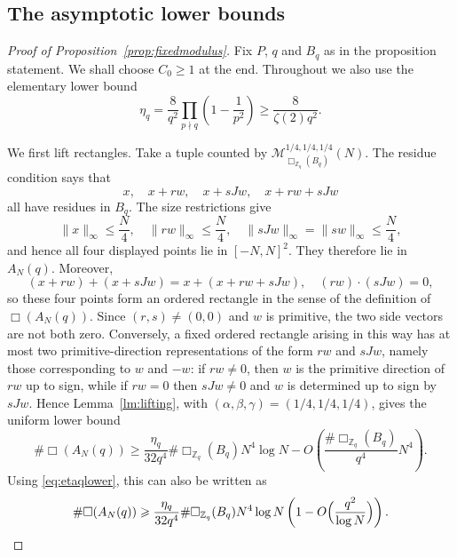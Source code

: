 \documentclass[10pt,a4paper]{amsart}
\numberwithin{equation}{section}
\newcommand{\norm}[1]{\lVert #1\rVert_\infty}
\renewcommand{\le}{\leqslant}
\renewcommand{\ge}{\geqslant}
\begin{document}
\subsection{The asymptotic lower bounds}
\begin{proof}[Proof of Proposition~\ref{prop:fixedmodulus}]
Fix $P$, $q$ and $B_q$ as in the proposition statement. 
We shall choose $C_0\ge1$ at the end. Throughout we also use the elementary lower bound
\begin{equation}\label{eq:etaqlower}
\eta_q=\frac8{q^2}\prod_{p\nmid q}\left(1-\frac1{p^2}\right) \ge \frac{8}{\zeta(2)q^2}.
\end{equation}

We first lift rectangles. Take a tuple counted by
$\mathcal{M}_{\Box_{\mathbb{Z}_q}(B_q)}^{1/4,1/4,1/4}(N)$. The residue condition says that
\[ x, \quad x+rw, \quad x+sJw, \quad x+rw+sJw \]
all have residues in $B_q$. The size restrictions give
\[ \norm{x}\le \frac{N}{4}, \quad \norm{rw}\le \frac{N}{4}, \quad \norm{sJw}=\norm{sw}\le \frac{N}{4}, \]
and hence all four displayed points lie in $[-N,N]^2$. They therefore lie in $A_N(q)$. Moreover,
\[ (x+rw)+(x+sJw)=x+(x+rw+sJw), \quad (rw)\cdot(sJw)=0, \]
so these four points form an ordered rectangle in the sense of the definition of $\Box(A_N(q))$. Since $(r,s)\ne(0,0)$ and $w$ is primitive, the two side vectors are not both zero. Conversely, a fixed ordered rectangle arising in this way has at most two primitive-direction representations of the form $rw$ and $sJw$, namely those corresponding to $w$ and $-w$: if $rw\ne0$, then $w$ is the primitive direction of $rw$ up to sign, while if $rw=0$ then $sJw\ne0$ and $w$ is determined up to sign by $sJw$. Hence Lemma~\ref{lm:lifting}, with $(\alpha,\beta,\gamma)=(1/4,1/4,1/4)$, gives the uniform lower bound
\[ \#\Box(A_N(q)) \ge \frac{\eta_q}{32q^4}\#\Box_{\mathbb{Z}_q}(B_q)N^4\log N - O\left(\frac{\#\Box_{\mathbb{Z}_q}(B_q)}{q^4}N^4\right). \]
Using \eqref{eq:etaqlower}, this can also be written as
\begin{equation}\label{eq:rectrelative}
\#\Box(A_N(q)) \ge \frac{\eta_q}{32q^4}\#\Box_{\mathbb{Z}_q}(B_q)N^4\log N \left(1-O\Bigl(\frac{q^2}{\log N}\Bigr)\right).
\end{equation}


\end{proof}
\end{document}
